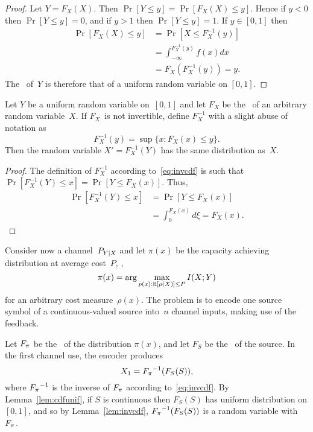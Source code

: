 \begin{proof}
  Let $Y = F_X(X)$. Then $\Pr[Y \le y] = \Pr[F_X(X) \le y]$.
  Hence if $y < 0$ then $\Pr[Y \le y] = 0$, and if $y > 1$ then $\Pr[Y \le y] =
  1$.  If $y \in [0,1]$ then
  \begin{align*}
    \Pr[F_X(X) \le y] &= \Pr[X \le F_X^{-1}(y)] \\
    &= \int_{-\infty}^{F_X^{-1}(y)} f(x) dx \\
    &= F_X(F_X^{-1}(y)) = y.
  \end{align*}
  The \cdf\ of~$Y$ is therefore that of a uniform random variable on $[0,1]$.
\end{proof}


\begin{lemma}
  \label{lem:invcdf}
  Let $Y$ be a uniform random variable on~$[0,1]$ and let $F_X$ be the \cdf\ of
  an arbitrary random variable~$X$. If $F_X$~is not invertible, define
  $F_X^{-1}$ with a slight abuse of notation as
  \begin{equation}
    \label{eq:invcdf}
    F_X^{-1}(y) = \sup \{x : F_X(x) \le y\}.
  \end{equation}
  Then the random variable $X' = F_X^{-1}(Y)$ has the same distribution as~$X$.
\end{lemma}

\begin{proof}
  The definition of $F_X^{-1}$ according to~\eqref{eq:invcdf} is such
  that $\Pr[F_X^{-1}(Y) \le x] = \Pr[Y \le F_X(x)]$. Thus,
  \begin{align*}
    \Pr[F_X^{-1}(Y) \le x] &= \Pr[Y \le F_X(x)] \\
    &= \int_0^{F_X(x)} d\xi = F_X(x).
  \end{align*}
\end{proof}

Consider now a channel~$P_{Y|X}$ and let $\pi(x)$ be the capacity achieving
distribution at average cost~$P$, \ie, 
\begin{equation*}
  \pi(x) = \arg\max_{p(x): \mathbb{E}[\rho(X)] \le P} I(X;Y)
\end{equation*}
for an arbitrary cost measure~$\rho(x)$.  The problem is to encode one source
symbol of a continuous-valued source into~$n$ channel inputs, making use of the
feedback.

Let ${F_{\pi}}$ be the \cdf\ of the distribution $\pi(x)$, and let $F_S$ be the \cdf\
of the source. In the first channel use, the encoder produces
\begin{equation}
  \label{eq:posteriorx1}
  X_1 = {F_{\pi}}^{-1}(F_S(S)),
\end{equation}
where ${F_{\pi}}^{-1}$ is the inverse of ${F_{\pi}}$ according to~\eqref{eq:invcdf}. By
Lemma~\ref{lem:cdfunif}, if $S$ is continuous then $F_S(S)$ has uniform
distribution on $[0,1]$, and so by Lemma~\ref{lem:invcdf}, ${F_{\pi}}^{-1}(F_S(S))$
is a random variable with \cdf\ ${F_{\pi}}$.

